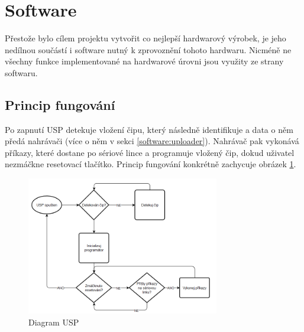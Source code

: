 \documentclass[11pt,a4paper,twoside,openright]{report}
\begin{document}




\pagebreak
\section {Software}

Přestože bylo cílem projektu vytvořit co nejlepší hardwarový výrobek, je jeho nedílnou součástí i software nutný k zprovoznění tohoto hardwaru. Nicméně ne všechny funkce implementované na hardwarové úrovni jsou využity ze strany softwaru. 

\subsection{Princip fungování}

Po zapnutí USP detekuje vložení čipu, který následně identifikuje a data o něm předá nahrávači (více o něm v sekci \ref{software:uploader}). Nahrávač pak vykonává příkazy, které dostane po sériové lince a programuje vložený čip, dokud uživatel nezmáčkne resetovací tlačítko. Princip fungování konkrétně zachycuje obrázek \ref{fig:app_diagram}. 

\begin{figure}[ht!]
  \includegraphics[width=0.75\textwidth]{img/app_diagram.png}
  \centering
  \caption{Diagram USP}
  \label{fig:app_diagram}
\end{figure}
\end{document}
